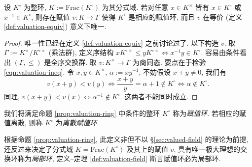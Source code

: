 \begin{proposition}\label{prop:valuation-ring}
	设 $K^\circ$ 为整环, $K := \mathrm{Frac}(K^\circ)$ 为其分式域. 若对任意 $x \in K^\times$ 皆有 $x \in K^\circ$ 或 $x^{-1} \in K^\circ$, 则存在赋值 $v: K \to \Gamma$ 使得 $K^\circ$ 是相应的赋值环, 而且 $v$ 在等价 (定义 \ref{def:valuation-equiv}) 意义下唯一.
\end{proposition}
\begin{proof}
	唯一性已经在定义 \ref{def:valuation-equiv} 之前讨论过了. 以下构造 $v$. 取 $\Gamma := K^\times/K^{\circ\times}$ (乘法群), 定义序结构 $x K^{\circ\times} \leq y K^{\circ\times} \iff x^{-1}y \in K^\circ$. 容易由条件看出 $(\Gamma, \leq)$ 是全序交换群. 取 $v: K^\times \to \Gamma$ 为商同态. 要点在于检验 \eqref{eqn:valuation-ineq}. 令 $x,y \in K^\times$, $\alpha := xy^{-1}$, 不妨假设 $x+y \neq 0$, 我们有
	\[ v(x+y) < v(y) \iff \frac{x+y}{y} = \alpha + 1 \notin K^\circ \iff \alpha \notin K^\circ. \]
	同理, $v(x+y) < v(x) \iff \alpha^{-1} \notin K^\circ$. 这两者不能同时成立.
\end{proof}

\begin{definition}\label{def:valuation-ring}
	我们将满足命题 \ref{prop:valuation-ring} 中条件的整环 $K^\circ$ 称为\emph{赋值环}. 若相应的赋值离散, 则称 $K^\circ$ 为\emph{离散赋值环}. 
\end{definition}
根据命题 \ref{prop:valuation-ring}, 此定义非但不以 \S\ref{sec:valued-field} 的理论为前提, 还反过来决定了分式域 $K = \text{Frac}(K^\circ)$ 及其上的赋值 $v$. 具有唯一极大理想的交换环称为\emph{局部环}, 定义--定理 \ref{def:valuation-field} 断言赋值环必为局部环. 

